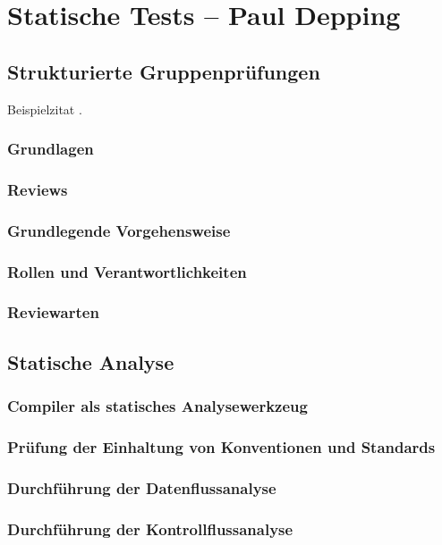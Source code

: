\documentclass[	%
		fontsize=11pt,  %
		a4paper,	    %
		german,		%
		sans,			%
		f4,				%
	]{HsH-report}		%
\begin{document}
\chapter{Statische Tests -- Paul Depping} \label{chap: static}
	\section{Strukturierte Gruppenprüfungen}
		Beispielzitat \cite{fagan:advances}.
		\subsection{Grundlagen}
			\lipsum[1]
		\subsection{Reviews}
			\lipsum[1]
		\subsection{Grundlegende Vorgehensweise}
			\lipsum[1]
		\subsection{Rollen und Verantwortlichkeiten}
			\lipsum[1]
		\subsection{Reviewarten}
	\section{Statische Analyse}
		\lipsum[1-2]
		\subsection{Compiler als statisches Analysewerkzeug}
			\lipsum[1]
		\subsection{Prüfung der Einhaltung von Konventionen und Standards}
			\lipsum[1]
		\subsection{Durchführung der Datenflussanalyse}
			\lipsum[1]
		\subsection{Durchführung der Kontrollflussanalyse}
			\lipsum[1]
\end{document}
